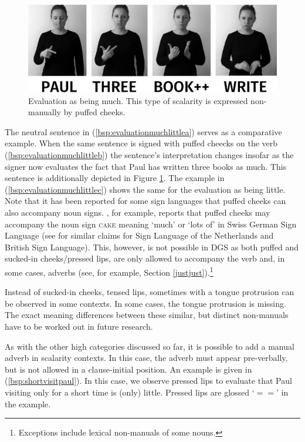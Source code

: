 \begin{figure}[bt]
\centering
	\includegraphics[width=1.0\textwidth]{evalmuchsw.jpg}
	\caption{Evaluation as being much. This type of scalarity is expressed non-manually by puffed cheeks.}
	\label{fig:evalgood}
\end{figure}

\noindent The neutral sentence in (\ref{bsp:evaluationmuchlittlea}) serves as a comparative example. When the same sentence is signed with puffed cheecks on the verb (\ref{bsp:evaluationmuchlittleb}) the sentence's interpretation changes insofar as the signer now evaluates the fact that Paul has written three books as much. This sentence is additionally depicted in Figure \ref{fig:evalgood}. The example in (\ref{bsp:evaluationmuchlittlec}) shows the same for the evaluation as being little. Note that it has been reported for some sign languages that puffed cheeks can also accompany noun signs. \citet[102--103]{boyesbram1990gebaerdesprache}, for example, reports that puffed cheeks may accompany the noun sign \textsc{cake} meaning `much' or `lots of' in Swiss German Sign Language (see \citealt{bakerpfau2016} for similar claims for Sign Language of the Netherlands and British Sign Language). This, however, is not possible in DGS as both puffed and sucked-in cheeks/pressed lips, are only allowed to accompany the verb and, in some cases, adverbs (see, for example, Section \ref{justjust}).\footnote{ Exceptions include lexical non-manuals of some nouns.}

Instead of sucked-in cheeks, tensed lips, sometimes with a tongue protrusion can be observed in some contexts. In some cases, the tongue protrusion is missing. The exact meaning differences between these similar, but distinct non-manuals have to be worked out in future research. 

As with the other high categories discussed so far, it is possible to add a manual adverb in scalarity contexts. In this case, the adverb must appear pre-verbally, but is not allowed in a clause-initial position. An example is given in (\ref{bsp:shortvisitpaul}). In this case, we observe pressed lips to evaluate that Paul visiting only for a short time is (only) little. Pressed lips are glossed `$==$' in the example.

